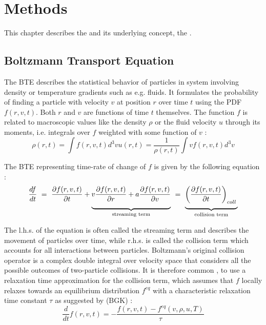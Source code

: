 \section{Methods}

This chapter describes the  and its underlying concept, the .

\subsection{Boltzmann Transport Equation}

The \gls{BTE} describes the statistical behavior of particles in system involving density or temperature gradients such as e.g. fluids. It formulates the probability of finding a particle with velocity $v$ at position $r$ over time $t$ using the \gls{PDF} $f(r,v,t)$. Both $r$ and $v$ are functions of time $t$ themselves. The function $f$ is related to macroscopic values like the density $\rho$ or the fluid velocity $u$ through its moments, i.e. integrals over $f$ weighted with some function of $v$ \cite{timm2016lattice}:
\begin{subequations}
    \begin{equation}
        \rho(r,t) = \int f(r,v,t) d^3v
        \label{eq:bte:moment:density}
    \end{equation}
    \begin{equation}
        u(r,t) = \frac{1}{\rho(r,t)} \int v f(r,v,t) d^3v
        \label{eq:bte:moment:velocity}
    \end{equation}
\end{subequations}

The \gls{BTE} representing time-rate of change of $f$ is given by the following equation \cite{mohamad2019}:
\begin{equation}
    \frac{df}{dt} ~=~ \frac{\partial f(r,v,t)}{\partial t} + \underbrace{v \frac{\partial f(r,v,t)}{\partial r} + a \frac{\partial f(r,v,t)}{\partial v}\vphantom{\frac{1}{\frac{2}{\frac{3}{4}}}}}_{\text{streaming term}} ~=~ \underbrace{\left(\frac{\partial f(r,v,t)}{\partial t}\right)_{coll}\vphantom{\frac{1}{\frac{2}{\frac{3}{4}}}}}_{\text{collision term}}
    \label{eq:bte}
\end{equation}

The l.h.s. of the equation is often called the streaming term and describes the movement of particles over time, while r.h.s. is called the collision term which accounts for all interactions between particles. Boltzmann's original collision operator is a complex double integral over velocity space that considers all the possible
outcomes of two-particle collisions. It is therefore common \cite{timm2016lattice}, to use a relaxation time approximation for the collision term, which assumes that $f$ locally relaxes towards an equilibrium distribution $f^{eq}$ with a characteristic relaxation time constant $\tau$ as suggested by \citeauthor{BGK} (BGK) \cite{BGK}:
\begin{equation}
    \frac{d}{dt} f(r,v,t) = - \frac{f(r,v,t) - f^{eq}\left(v,\rho,u,T\right)}{\tau}
    \label{eq:bgk-collision}
\end{equation}

